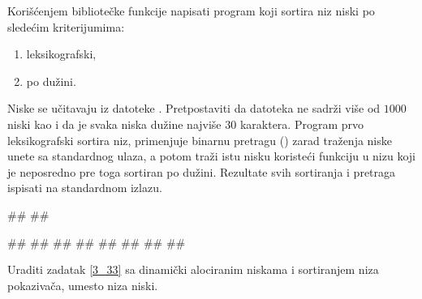 \begin{Answer}[ref=3_32]
\end{Answer}
\begin{Exercise}[label=3_33]
   Korišćenjem bibliotečke funkcije  napisati program
   koji sortira niz niski po sledećim kriterijumima:
   \begin{enumerate}
   \item leksikografski,
   \item po dužini.
   \end{enumerate}
   Niske se učitavaju iz datoteke . Pretpostaviti da datoteka ne sadrži više od 
   $1000$ niski kao i da je svaka niska dužine najviše $30$ karaktera. Program prvo
   leksikografski sortira niz, primenjuje binarnu pretragu
   () zarad traženja niske unete sa standardnog ulaza,
   a potom traži istu nisku koristeći funkciju  u nizu koji je neposredno pre toga
   sortiran po dužini. Rezultate svih sortiranja
   i pretraga ispisati na standardnom izlazu.

   
\begin{maxitest}
\begin{upotreba}{1}
##
##
  
#\naslovInt#
##
##
##
##
##
##
##
\end{upotreba}
\end{maxitest}
  
\end{Exercise}

\begin{Answer}[ref=3_33]
\end{Answer}
\begin{Exercise}[label=3_34]
  Uraditi zadatak \ref{3_33} sa dinamički alociranim niskama
  i sortiranjem niza pokazivača, umesto niza niski.
  
\end{Exercise}

